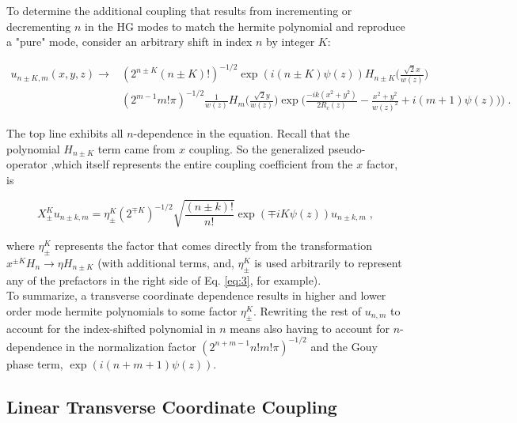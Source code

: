 \documentclass[aps,twoside,secnumarabic,balancelastpage,amsmath,amssymb,nofootinbib,hyperref=pdftex]{revtex4}
\begin{document}
To determine the additional coupling that results from incrementing or decrementing $n$ in the HG modes to match the hermite polynomial and reproduce a "pure" mode, consider an arbitrary shift in index $n$ by integer $K$: 

	\begin{align*} 
		u_{n \pm K,m}(x,y,z) \rightarrow &
		(2^{n \pm K} (n \pm K)!)^{-1/2}
		\exp(i(n\pm K)\psi(z))
				H_{n \pm K} \Big( \frac{\sqrt{2}x}{w(z)} \Big)
		\\&
		(2^{m-1}m!\pi)^{-1/2}
		\frac{1}{w(z)}
		H_{m} \Big(\frac{\sqrt{2}y}{w(z)} \Big)
		\exp 
		\Big(
		\frac{-ik(x^{2}+y^{2})}{2R_{c}(z)}
		-\frac{x^{2}+y^{2}}{w(z)^{2}} 
		+i(m+1)\psi(z))	
		\Big)\;.
	\end{align*}


The top line exhibits all $n$-dependence in the equation. Recall that the polynomial $H_{n\pm K}$ term came from $x$ coupling.
So the generalized pseudo-operator ,which itself represents the entire coupling coefficient from the $x$ factor, is

\begin{equation}
	X_{\pm }^K u_{n \pm k, m} = 
		\eta_{\pm}^K
		(2^{\mp K} )^{-1/2}
		\sqrt{\frac{(n \pm k)!}{n!} }
		\exp(\mp iK  \psi(z))
		u_{n \pm k, m}		
		\;,
\end{equation}

where $\eta_{\pm}^K$ represents the factor that comes directly from the transformation $x^{\pm K} H_n \rightarrow \eta H_{n\pm K}$ (with additional terms, and, $\eta_{\pm}^K$ is used arbitrarily to represent any of the prefactors in the right side of Eq. \ref{eq:3}, for example).\\

To summarize, a transverse coordinate dependence results in higher and lower order mode hermite polynomials to some factor $\eta_{\pm}^K$. Rewriting the rest of $u_{n,m}$ to account for the index-shifted polynomial in $n$ means also having to account for $n$-dependence in the normalization factor $(2^{n+m-1}n!m!\pi)^{-1/2}$ and the Gouy phase term, $\exp(i(n+m+1)\psi(z))$.\\





\clearpage

\subsection{Linear Transverse Coordinate Coupling}
\end{document}
